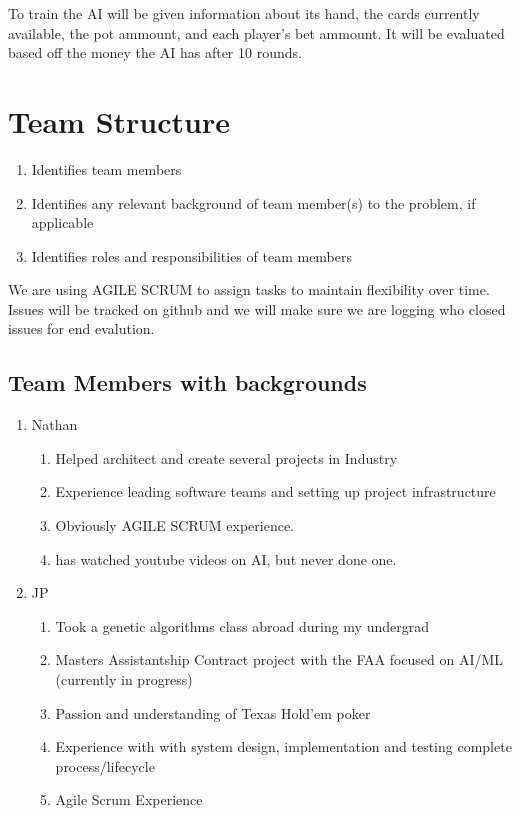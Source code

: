 \documentclass[11pt]{article}
\begin{document}
To train the AI will be given information about its hand, the cards currently available, the pot ammount, and
each player's bet ammount. It will be evaluated based off the money the AI has after 10 rounds.

\section{Team Structure}
\begin{enumerate}
\item Identifies team members
\item Identifies any relevant background of team member(s) to the problem, if applicable
\item Identifies roles and responsibilities of team members
\end{enumerate}

We are using AGILE SCRUM to assign tasks to maintain flexibility over time. Issues will be tracked on github and
we will make sure we are logging who closed issues for end evalution.
\subsection{Team Members with backgrounds}
\begin{enumerate}
\item Nathan 
  \begin{enumerate}
  \item Helped architect and create several projects in Industry
  \item Experience leading software teams and setting up project infrastructure
  \item Obviously AGILE SCRUM experience.
  \item has watched youtube videos on AI, but never done one.
  \end{enumerate}
\item JP
  \begin{enumerate}
  \item Took a genetic algorithms class abroad during my undergrad
  \item Masters Assistantship Contract project with the FAA focused on AI/ML (currently in progress)
  \item Passion and understanding of Texas Hold'em poker
  \item Experience with with system design, implementation and testing complete process/lifecycle
  \item Agile Scrum Experience
  \end{enumerate}
\end{enumerate}
\end{document}
